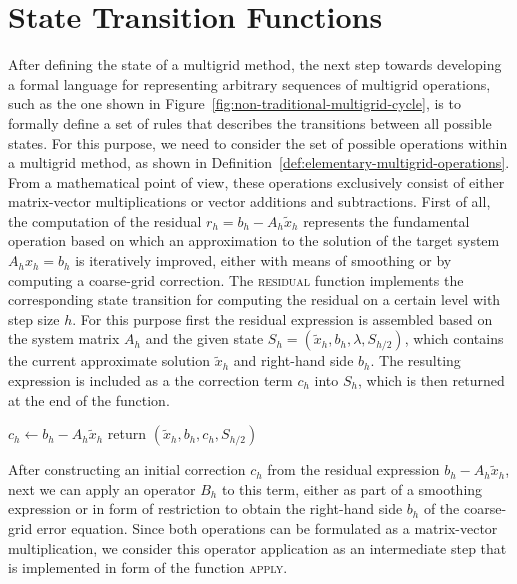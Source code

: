 \section{State Transition Functions}
\label{sec:multigrid-state-transitions}
After defining the state of a multigrid method, the next step towards developing a formal language for representing arbitrary sequences of multigrid operations,
such as the one shown in Figure~\ref{fig:non-traditional-multigrid-cycle}, is to formally define a set of rules that describes the transitions between all possible states.
For this purpose, we need to consider the set of possible operations within a multigrid method, as shown in Definition~\ref{def:elementary-multigrid-operations}.
From a mathematical point of view, these operations exclusively consist of either matrix-vector multiplications or vector additions and subtractions.
First of all, the computation of the residual $r_h = b_h - A_h \tilde{x}_h$ represents the fundamental operation based on which an approximation to the solution of the target system $A_h x_h = b_h$ is iteratively improved, either with means of smoothing or by computing a coarse-grid correction.
The \textsc{residual} function implements the corresponding state transition for computing the residual on a certain level with step size $h$.
For this purpose first the residual expression is assembled based on the system matrix $A_h$ and the given state $S_h = (\tilde{x}_h, b_h, \lambda, S_{h/2})$, which contains the current approximate solution $\tilde{x}_h$ and right-hand side $b_h$.
The resulting expression is included as a the correction term $c_h$ into $S_h$, which is then returned at the end of the function.
\begin{algorithm}
	\begin{algorithmic}
		\State $c_h \gets b_h - A_h \tilde{x}_h$
		\State return $(\tilde{x}_h, b_h, c_h, S_{h/2})$
		\EndFunction
	\end{algorithmic}
\label{alg:state-transition-residual}
\end{algorithm}
After constructing an initial correction $c_h$ from the residual expression $b_h - A_h \tilde{x}_h$, next we can apply an operator $B_h$ to this term, either as part of a smoothing expression or in form of restriction to obtain the right-hand side $b_h$ of the coarse-grid error equation.
Since both operations can be formulated as a matrix-vector multiplication, we consider this operator application as an intermediate step that is implemented in form of the function \textsc{apply}.
